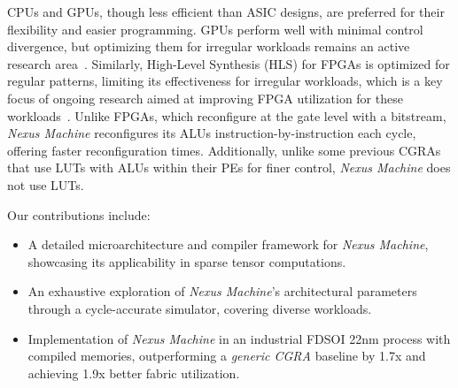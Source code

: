 \begin{comment}
CPUs and GPUs, despite their energy and area costs compared to ASIC designs, are favored due to their flexibility and simplified programming methods. While GPUs excel with minimal control divergence, optimizing their performance with irregular workloads remains an ongoing research area~\cite{irregular_gpu, irregular_gpu1}. Unlike FPGAs that reconfigure at the gate level with a bitstream, \textit{Nexus Machine} reconfigures its ALUs instruction-by-instruction each cycle, resulting in faster reconfiguration time.
{\color{blue}
Additionally, unlike some previous CGRAs~\cite{dynamic_ii} that incorporate LUTs with ALUs within their PEs for finer control, \textit{Nexus Machine} does not use any LUTs.
}
\end{comment}
CPUs and GPUs, though less efficient than ASIC designs, are preferred for their flexibility and easier programming. GPUs perform well with minimal control divergence, but optimizing them for irregular workloads remains an active research area~\cite{irregular_gpu,irregular_gpu1}. Similarly, High-Level Synthesis (HLS) for FPGAs is optimized for regular patterns, limiting its effectiveness for irregular workloads, which is a key focus of ongoing research aimed at improving FPGA utilization for these workloads~\cite{irregular_fpga,irregular_fpga2}. Unlike FPGAs, which reconfigure at the gate level with a bitstream, \textit{Nexus Machine} reconfigures its ALUs instruction-by-instruction each cycle, offering faster reconfiguration times. Additionally, unlike some previous CGRAs~\cite{dynamic_ii} that use LUTs with ALUs within their PEs for finer control, \textit{Nexus Machine} does not use LUTs.

Our contributions include:
\begin{itemize}
    \item A detailed microarchitecture and compiler framework for \textit{Nexus Machine}, showcasing its applicability in sparse tensor computations.
    \item An exhaustive exploration of \textit{Nexus Machine}'s architectural parameters through a cycle-accurate simulator, covering diverse workloads.
    \item Implementation of \textit{Nexus Machine} in an industrial FDSOI 22nm process with compiled memories, outperforming a \textit{generic CGRA} baseline by 1.7x and achieving 1.9x better fabric utilization.
\end{itemize}